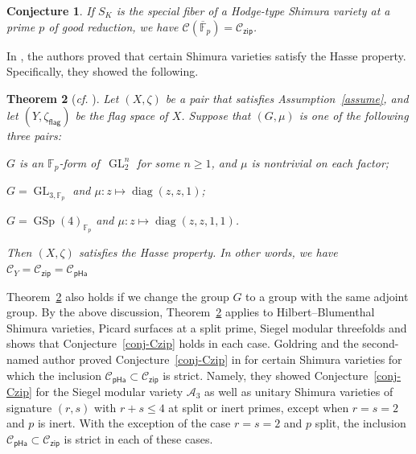 \documentclass[11pt]{amsart}
\numberwithin{equation}{section}
\newtheorem{theorem}{Theorem}[section]
\newtheorem{conjecture}[theorem]{Conjecture}
\theoremstyle{definition}
\theoremstyle{remark}
\newcommand{\pha}{\mathsf{pHa}}
\newcommand{\zipsf}{\mathsf{zip}}
\newcommand{\flag}{\mathsf{flag}}
\newcommand{\Acal}{{\mathcal A}}
\newcommand{\Ccal}{{\mathcal C}}
\newcommand{\FF}{\mathbb{F}}
\DeclareMathOperator{\GL}{GL}
\DeclareMathOperator{\GSp}{GSp}
\DeclareMathOperator{\diag}{diag}
\begin{document}
\begin{conjecture}\label{conj-shimura}
If $S_K$ is the special fiber of a Hodge-type Shimura variety at a prime $p$ of good reduction, we have $\Ccal(\overline{\FF}_p) = \Ccal_{\zipsf}$.
\end{conjecture}

In \cite[Theorem D]{Goldring-Koskivirta-global-sections-compositio}, the authors proved that certain Shimura varieties satisfy the Hasse property. Specifically, they showed the following. 

\begin{theorem}[\textit{cf.} {\cite[Theorem D]{Goldring-Koskivirta-global-sections-compositio}}]\label{thmcones}
Let $(X,\zeta)$ be a pair that satisfies Assumption~\ref{assume}, and let $(Y,\zeta_{\flag})$ be the flag space of $X$. Suppose that $(G,\mu)$ is one of the following three pairs:
\begin{assertionlist}
    \item\label{thmcones-1} $G$ is an $\FF_p$-form of\, $\GL_2^n$ for some $n\geq 1$, and $\mu$ is nontrivial on each factor;
    \item\label{thmcones-2} $G=\GL_{3,\FF_p}$ and $\mu\colon z\mapsto \diag(z,z,1)$; 
    \item\label{thmcones-3} $G=\GSp(4)_{\FF_p}$ and $\mu\colon z\mapsto \diag(z,z,1,1)$.
\end{assertionlist}
Then $(X,\zeta)$ satisfies the Hasse property. In other words, we have $\Ccal_Y = \Ccal_{\zipsf} = \Ccal_{\pha}$
\end{theorem}

Theorem~\ref{thmcones} also holds if we change the group $G$ to a group with the same adjoint group. By the above discussion, Theorem~\ref{thmcones} applies to Hilbert--Blumenthal Shimura varieties, Picard surfaces at a split prime, Siegel modular threefolds and shows that Conjecture~\ref{conj-Czip} holds in each case. Goldring and the second-named author proved Conjecture~\ref{conj-Czip} in \cite{Goldring-Koskivirta-divisibility} for certain Shimura varieties for which the inclusion $\Ccal_{\pha}\subset \Ccal_{\zipsf}$ is strict. Namely, they showed Conjecture~\ref{conj-Czip} for the Siegel modular variety $\Acal_3$ as well as unitary Shimura varieties of signature $(r,s)$ with $r+s\leq 4$ at split or inert primes, except when $r=s=2$ and $p$ is inert. With the exception of the case $r=s=2$ and $p$ split, the inclusion $\Ccal_{\pha}\subset \Ccal_{\zipsf}$ is strict in each of these cases.
\end{document}
